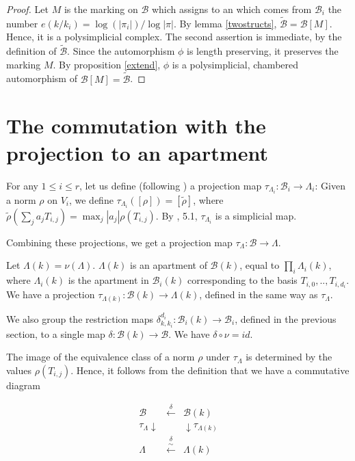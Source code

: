 \documentclass{amsart}
\theoremstyle{theorem}
\theoremstyle{lemma}
\theoremstyle{prop}
\theoremstyle{definition}
\theoremstyle{corollary}
\theoremstyle{remark}
\newcommand{\B}{\mathcal{B}}
\begin{document}
\begin{proof} Let $M$ is the marking on $\B$ which assigns to an which comes from $\B_i$ the number $e(k/k_i)=\log(|\pi_i|)/\log |\pi|$. By lemma \ref{twostructs}, $\tilde{\B}=\B[M]$. Hence, it is a polysimplicial complex. The second assertion is immediate, by the definition of $\tilde{\B}$. Since the automorphism $\phi$ is length preserving, it preserves the marking $M$. By proposition \ref{extend}, $\phi$ is a polysimplicial, chambered automorphism of $\B[M]=\tilde{\B}$. \end{proof}


\section{The commutation with the projection to an apartment}

For any $1\leq i \leq r$, let us define (following \cite{ber}) a projection map $\tau_{\Lambda_i}:\B_i \rightarrow \Lambda_i$: Given a norm $\rho$ on $V_i$, we define $\tau_{\Lambda_i}([\rho])=[\tilde{\rho}]$, where $\tilde{\rho}(\sum_j a_j T_{i,j})= \max_j |a_j|\rho(T_{i,j})$. By \cite{ber}, 5.1, $\tau_{\Lambda_i}$ is a simplicial map.

Combining these projections, we get a projection map $\tau_{\Lambda}:\B \rightarrow \Lambda$. 

Let $\Lambda(k)=\nu(\Lambda)$. $\Lambda(k)$ is an apartment of $\B(k)$, equal to $\prod_i \Lambda_i(k)$, where $\Lambda_i(k)$ is the apartment in $\B_i(k)$ corresponding to the basis $T_{i,0},..,T_{i,d_i}$. We have a projection $\tau_{\Lambda(k)}:\B(k) \rightarrow \Lambda(k)$, defined in the same way as $\tau_\Lambda$.

We also group the restriction maps $\delta^{d_i}_{k,k_i}:\B_i(k) \rightarrow \B_i$, defined in the previous section, to a single map $\delta: \B(k) \rightarrow \B$. We have $\delta \circ \nu = id$.

The image of the equivalence class of a norm $\rho$ under $\tau_{\Lambda}$ is determined by the values $\rho(T_{i,j})$. Hence, it follows from the definition that we have a commutative diagram 

\[\begin{array}{ccc}
\B &\overset{\delta}{\leftarrow}&\B(k) \\
\tau_\Lambda \downarrow & & \downarrow \tau_{\Lambda(k)}\\
\Lambda & \overset{\delta}{\xleftarrow{\sim}} & \Lambda(k) \\
\end{array}\]
\end{document}
